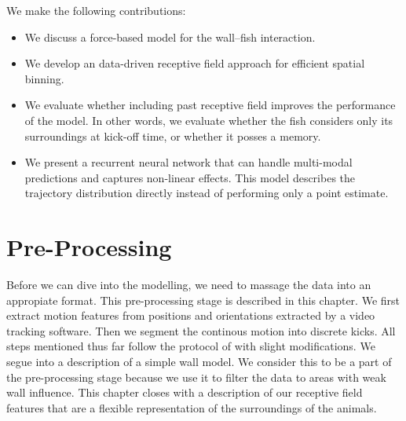 \documentclass[nobib, a4paper]{tufte-handout}
\begin{document}
We make the following contributions:
\begin{itemize}
\item We discuss a force-based model for the wall--fish interaction.
\item We develop an data-driven receptive field approach for efficient spatial binning.
\item We evaluate whether including past receptive field improves the performance of the model.
  In other words, we evaluate whether the fish considers only its surroundings at kick-off time, or whether it posses a memory.
\item We present a recurrent neural network that can handle multi-modal predictions and captures non-linear effects.
  This model describes the trajectory distribution directly instead of performing only a point estimate.
\end{itemize}

\section{Pre-Processing}
Before we can dive into the modelling, we need to massage the data into an appropiate format.
This pre-processing stage is described in this chapter.
We first extract motion features from positions and orientations extracted by a video tracking software.
Then we segment the continous motion into discrete kicks.
All steps mentioned thus far follow the protocol of \citeauthor{calovi}\autocite{calovi} with slight modifications.
We segue into a description of a simple wall model.
We consider this to be a part of the pre-processing stage because we use it to filter the data to areas with weak wall influence.
This chapter closes with a description of our receptive field features that are a flexible representation of the surroundings of the animals.
\end{document}
